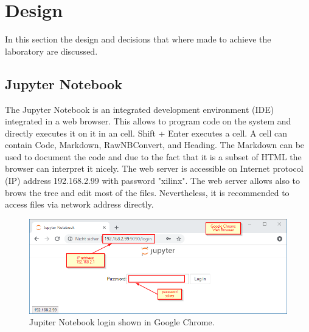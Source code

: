 \section{Design}\label{sec: Design}
In this section the design and decisions that where made to achieve the laboratory are discussed.

\subsection{Jupyter Notebook}\label{subsec: Jupyter Notebook}
The Jupyter Notebook is an integrated development environment (IDE) integrated in a web browser. This allows to program code on the system and directly executes it on it in an cell. Shift + Enter executes a cell. A cell can contain Code, Markdown, RawNBConvert, and Heading. The Markdown can be used to document the code and due to the fact that it is a subset of HTML the browser can interpret it nicely. 
The web server is accessible on Internet protocol (IP) address 192.168.2.99 with password "xilinx". The web server allows also to brows the tree and edit most of the files. Nevertheless, it is recommended to access files via network address directly.

	\begin{figure}[H]
	\centering
	\includegraphics[width=\textwidth]{01_images/part2_login.PNG}
	\caption{Jupiter Notebook login shown in Google Chrome.}
	\label{fig: part2_login}
	\end{figure}

